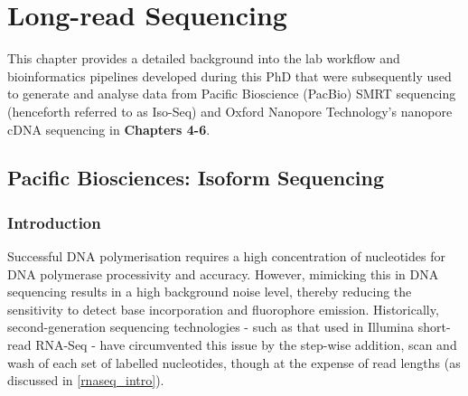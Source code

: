 \chapter{Long-read Sequencing}\label{ch: long_read_sequencing}

This chapter provides a detailed background into the lab workflow and bioinformatics pipelines developed during this PhD that were subsequently used to generate and analyse data from Pacific Bioscience (PacBio) SMRT sequencing (henceforth referred to as Iso-Seq) and Oxford Nanopore Technology's nanopore cDNA sequencing in \textbf{Chapters 4-6}. 

\section{Pacific Biosciences: Isoform Sequencing}
\label{sec:pb_isoform_sequencing}

\subsection{Introduction}
Successful DNA polymerisation requires a high concentration of nucleotides for DNA polymerase processivity and accuracy. However, mimicking this in DNA sequencing results in a high background noise level, thereby reducing the sensitivity to detect base incorporation and fluorophore emission. Historically, second-generation sequencing technologies - such as that used in Illumina short-read RNA-Seq - have circumvented this issue by the step-wise addition, scan and wash of each set of labelled nucleotides, though at the expense of read lengths (as discussed in \cref{rnaseq_intro}). 

